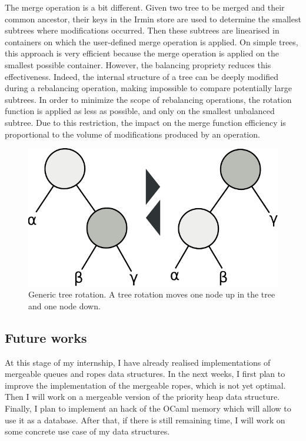\documentclass{article}
\renewcommand{\-}{\hyp}
\newcommand{\irmin}{Irmin\xspace}
\newcommand{\ocaml}{OCaml\xspace}
\begin{document}
The merge operation is a bit different.
Given two tree to be merged and their common ancestor, their keys in the \irmin store are used to determine the smallest subtrees where modifications occurred.
Then these subtrees are linearised in containers on which the user-defined merge operation is applied.
On simple trees, this approach is very efficient because the merge operation is applied on the smallest possible container.
However, the balancing propriety reduces this effectiveness.
Indeed, the internal structure of a tree can be deeply modified during a rebalancing operation, making impossible to compare potentially large subtrees.
In order to minimize the scope of rebalancing operations, the rotation function is applied as less as possible, and only on the smallest unbalanced subtree.
Due to this restriction, the impact on the merge function efficiency is proportional to the volume of modifications produced by  an operation.

\begin{figure}[hbt]
\centering
\includegraphics[scale=0.6]{rotations.pdf}
\caption{Generic tree rotation. A tree rotation moves one node up in the tree and one node down.}
\label{rotation}
\end{figure}

\subsection{Future works}

At this stage of my internship, I have already realised implementations of mergeable  queues and ropes data structures.
In the next weeks, I first plan to improve the implementation of the mergeable ropes, which is not yet optimal.
Then I will work on a mergeable version of the priority heap data structure.
Finally, I plan to implement an hack of the \ocaml memory which will allow to use it as a database.
After that, if there is still remaining time, I will work on some concrete use case of my data structures.
\end{document}
